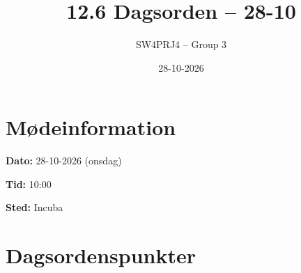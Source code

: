 \documentclass[a4paper,11pt]{article}
\title{12.6 Dagsorden -- 28-10}
\author{SW4PRJ4 -- Group 3}
\date{28-10-2026}
\begin{document}
\maketitle

\section*{Mødeinformation}

\textbf{Dato:} 28-10-2026 (onsdag)

\textbf{Tid:} 10:00

\textbf{Sted:} Incuba

\section*{Dagsordenspunkter}
\end{document}
